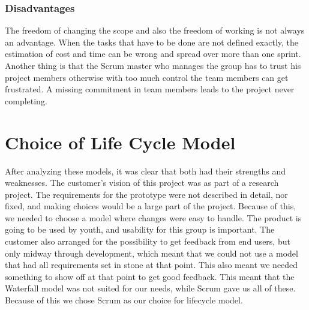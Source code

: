 \subsubsection{Disadvantages}
The freedom of changing the scope and also the freedom of working is not always an advantage. When the tasks that have to be done are not defined exactly, the estimation of cost and time can be wrong and spread over more than one sprint. Another thing is that the Scrum master who manages the group has to trust his project members otherwise with too much control the team members can get frustrated. A missing commitment in team members leads to the project never completing.

\section{Choice of Life Cycle Model}
After analyzing these models, it was clear that both had their strengths and weaknesses. The customer's vision of this project was as part of a research project. The requirements for the prototype were not described in detail, nor fixed, and making choices would be a large part of the project. Because of this, we needed to choose a model where changes were easy to handle. The product is going to be used by youth, and usability for this group is important. The customer also arranged for the possibility to get feedback from end users, but only midway through development, which meant that we could not use a model that had all requirements set in stone at that point. This also meant we needed something to show off at that point to get good feedback. This meant that the Waterfall model was not suited for our needs, while Scrum gave us all of these. Because of this we chose Scrum as our choice for lifecycle model.